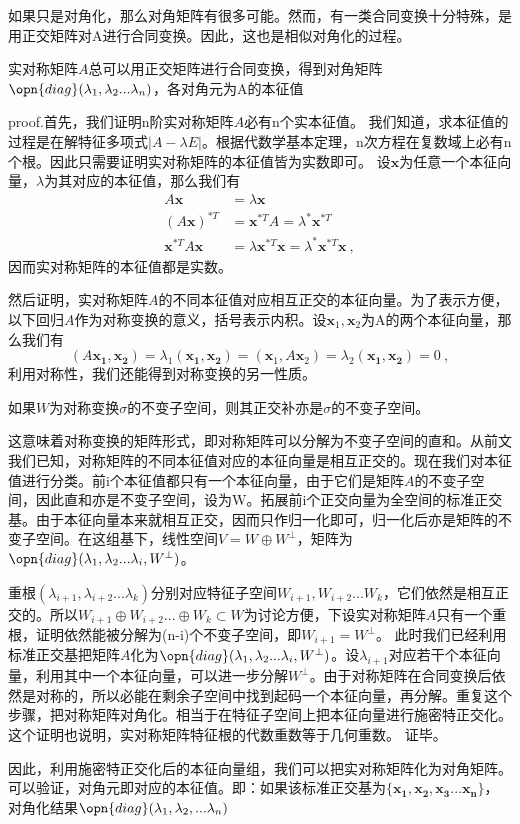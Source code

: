 如果只是对角化，那么对角矩阵有很多可能。然而，有一类合同变换十分特殊，是用正交矩阵对A进行合同变换。因此，这也是相似对角化的过程。
\begin{theorem}{}\label{the_lialg_1}
实对称矩阵$A$总可以用正交矩阵进行合同变换，得到对角矩阵$\opn{diag}(\lambda_1,\lambda_2...\lambda_n)$，各对角元为A的本征值
\end{theorem}  

proof.首先，我们证明n阶实对称矩阵$A$必有n个实本征值。
我们知道，求本征值的过程是在解特征多项式$|A-\lambda E|$。根据代数学基本定理，n次方程在复数域上必有n个根。因此只需要证明实对称矩阵的本征值皆为实数即可。
设$\boldsymbol x$为任意一个本征向量，$\lambda$为其对应的本征值，那么我们有
\begin{equation}
\begin{aligned}
A\boldsymbol x&=\lambda \boldsymbol x\\
(A\boldsymbol x)^{*T}&=\boldsymbol x^{*T}A=\lambda^{*}\boldsymbol x^{*T}\\
\boldsymbol x^{*T}A\boldsymbol x&=\lambda \boldsymbol x^{*T}\boldsymbol x=\lambda^{*}\boldsymbol x^{*T}\boldsymbol x~,
\end{aligned}
\end{equation}
因而实对称矩阵的本征值都是实数。

然后证明，实对称矩阵$A$的不同本征值对应相互正交的本征向量。为了表示方便，以下回归$A$作为对称变换的意义，括号表示内积。设$\boldsymbol x_1,\boldsymbol x_2$为A的两个本征向量，那么我们有
$$(A\boldsymbol {x_1,x_2})=\lambda_1(\boldsymbol {x_1,x_2})=(\boldsymbol x_1,A\boldsymbol x_2)=\lambda_2(\boldsymbol{x_1,x_2})=0~,$$
利用对称性，我们还能得到对称变换的另一性质。
\begin{lemma}{}
如果$W$为对称变换$\sigma$的不变子空间，则其正交补亦是$\sigma$的不变子空间。
\end{lemma}
这意味着对称变换的矩阵形式，即对称矩阵可以分解为不变子空间的直和。从前文我们已知，对称矩阵的不同本征值对应的本征向量是相互正交的。现在我们对本征值进行分类。前i个本征值都只有一个本征向量，由于它们是矩阵$A$的不变子空间，因此直和亦是不变子空间，设为W。拓展前i个正交向量为全空间的标准正交基。由于本征向量本来就相互正交，因而只作归一化即可，归一化后亦是矩阵的不变子空间。在这组基下，线性空间$V=W\oplus W^{\perp}$，矩阵为$\opn{diag}(\lambda_1,\lambda_2...\lambda_i,W^{\perp})$。

重根$(\lambda_{i+1},\lambda_{i+2}...\lambda_k)$分别对应特征子空间$W_{i+1},W_{i+2}...W_k$，它们依然是相互正交的。所以$W_{i+1}\oplus W_{i+2}...\oplus W_k\subset W$为讨论方便，下设实对称矩阵$A$只有一个重根，证明依然能被分解为(n-i)个不变子空间，即$W_{i+1}=W^{\perp}$。
此时我们已经利用标准正交基把矩阵$A$化为$\opn{diag}(\lambda_1,\lambda_2...\lambda_i,W^{\perp})$。设$\lambda_{i+1}$对应若干个本征向量，利用其中一个本征向量，可以进一步分解$W^{\perp}$。由于对称矩阵在合同变换后依然是对称的，所以必能在剩余子空间中找到起码一个本征向量，再分解。重复这个步骤，把对称矩阵对角化。相当于在特征子空间上把本征向量进行施密特正交化。
这个证明也说明，实对称矩阵特征根的代数重数等于几何重数。
证毕。

因此，利用施密特正交化后的本征向量组，我们可以把实对称矩阵化为对角矩阵。可以验证，对角元即对应的本征值。即：如果该标准正交基为$\{\boldsymbol{x_1,x_2,x_3...x_n}\}$，对角化结果$\opn{diag}(\lambda_1,\lambda_2,...\lambda_n)$
